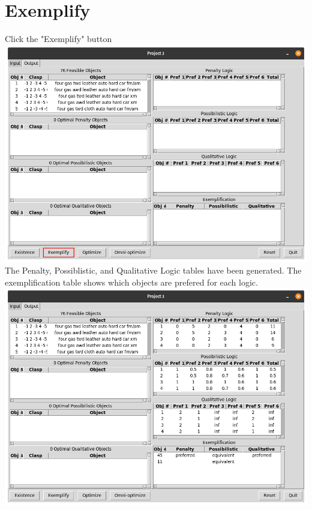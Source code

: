 \documentclass[12pt]{report}
\begin{document}
\section{Exemplify} Click the "Exemplify" button\\
\includegraphics[scale=0.3]{exemplify}\\
The Penalty, Possiblistic, and Qualitative Logic tables have been generated. The exemplification table shows which objects are prefered for each logic.\\
\includegraphics[scale=0.3]{post_exemplify}
\newpage
\end{document}

